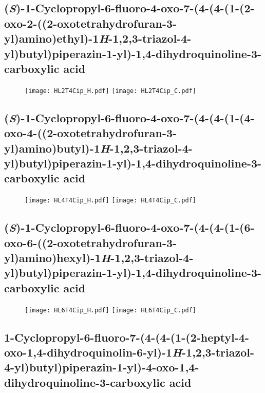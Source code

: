 \subsection{(\textit{S})-1-Cyclopropyl-6-fluoro-4-oxo-7-(4-(4-(1-(2-oxo-2-((2-oxotetrahydrofuran-3-yl)amino)ethyl)-1\textit{H}-1,2,3-triazol-4-yl)butyl)piperazin-1-yl)-1,4-dihydroquinoline-3-carboxylic acid }

\begin{figure}[H]
	\centering
		\texttt{[image: HL2T4Cip\_H.pdf]}
		\texttt{[image: HL2T4Cip\_C.pdf]}
\end{figure}

\subsection{(\textit{S})-1-Cyclopropyl-6-fluoro-4-oxo-7-(4-(4-(1-(4-oxo-4-((2-oxotetrahydrofuran-3-yl)amino)butyl)-1\textit{H}-1,2,3-triazol-4-yl)butyl)piperazin-1-yl)-1,4-dihydroquinoline-3-carboxylic acid }

\begin{figure}[H]
	\centering
		\texttt{[image: HL4T4Cip\_H.pdf]}
		\texttt{[image: HL4T4Cip\_C.pdf]}
\end{figure}

\subsection{(\textit{S})-1-Cyclopropyl-6-fluoro-4-oxo-7-(4-(4-(1-(6-oxo-6-((2-oxotetrahydrofuran-3-yl)amino)hexyl)-1\textit{H}-1,2,3-triazol-4-yl)butyl)piperazin-1-yl)-1,4-dihydroquinoline-3-carboxylic acid }

\begin{figure}[H]
	\centering
		\texttt{[image: HL6T4Cip\_H.pdf]}
		\texttt{[image: HL6T4Cip\_C.pdf]}
\end{figure}

\subsection{1-Cyclopropyl-6-fluoro-7-(4-(4-(1-(2-heptyl-4-oxo-1,4-dihydroquinolin-6-yl)-1\textit{H}-1,2,3-triazol-4-yl)\allowbreak bu\allowbreak tyl)piperazin-1-yl)-4-oxo-1,4-dihydroquinoline-3-carboxylic acid }


